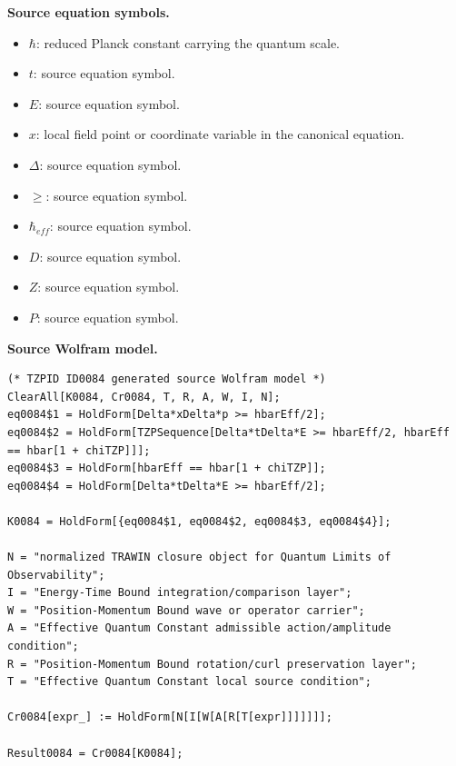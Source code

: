 \begin{minipage}[t]{0.49\linewidth}
\begingroup
\small
\raggedright
\textbf{Source equation symbols.}\par
\begin{itemize}[leftmargin=1.35em,itemsep=1pt,topsep=1pt,parsep=0pt]
    \item $\hbar$: reduced Planck constant carrying the quantum scale.
    \item $t$: source equation symbol.
    \item $E$: source equation symbol.
    \item $x$: local field point or coordinate variable in the canonical equation.
    \item $\Delta$: source equation symbol.
    \item $\ge$: source equation symbol.
    \item $\hbar_{eff}$: source equation symbol.
    \item $D$: source equation symbol.
    \item $Z$: source equation symbol.
    \item $P$: source equation symbol.
\end{itemize}
\endgroup
\end{minipage}\hfill
\begin{minipage}[t]{0.47\linewidth}
\begingroup
\scriptsize
\raggedright
\textbf{Source Wolfram model.}\par
\begin{Verbatim}[fontsize=\tiny,breaklines=true,breakanywhere=true]
(* TZPID ID0084 generated source Wolfram model *)
ClearAll[K0084, Cr0084, T, R, A, W, I, N];
eq0084$1 = HoldForm[Delta*xDelta*p >= hbarEff/2];
eq0084$2 = HoldForm[TZPSequence[Delta*tDelta*E >= hbarEff/2, hbarEff == hbar[1 + chiTZP]]];
eq0084$3 = HoldForm[hbarEff == hbar[1 + chiTZP]];
eq0084$4 = HoldForm[Delta*tDelta*E >= hbarEff/2];

K0084 = HoldForm[{eq0084$1, eq0084$2, eq0084$3, eq0084$4}];

N = "normalized TRAWIN closure object for Quantum Limits of Observability";
I = "Energy-Time Bound integration/comparison layer";
W = "Position-Momentum Bound wave or operator carrier";
A = "Effective Quantum Constant admissible action/amplitude condition";
R = "Position-Momentum Bound rotation/curl preservation layer";
T = "Effective Quantum Constant local source condition";

Cr0084[expr_] := HoldForm[N[I[W[A[R[T[expr]]]]]]];

Result0084 = Cr0084[K0084];
\end{Verbatim}
\endgroup
\end{minipage}

